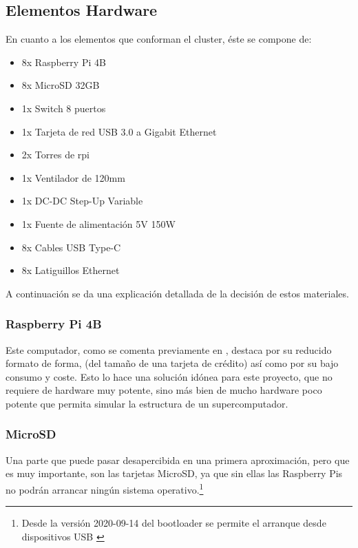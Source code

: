 \subsection{Elementos Hardware}


En cuanto a los elementos que conforman el cluster, éste se compone de:
\begin{itemize}
    \item 8x Raspberry Pi 4B
    \item 8x MicroSD 32GB
    \item 1x Switch 8 puertos
    \item 1x Tarjeta de red USB 3.0 a Gigabit Ethernet 
    \item 2x Torres de \acrshort{rpi}
    \item 1x Ventilador de 120mm
    \item 1x DC-DC Step-Up Variable 
    \item 1x Fuente de alimentación 5V 150W
    \item 8x Cables USB Type-C
    \item 8x Latiguillos Ethernet
\end{itemize}

A continuación se da una explicación detallada de la decisión de estos materiales.

\subsubsection{Raspberry Pi 4B}
Este computador, como se comenta previamente en , destaca por su reducido formato de forma, (del tamaño de una tarjeta de crédito) así como por su bajo consumo y coste. Esto lo hace una solución idónea para este proyecto, que no requiere de hardware muy potente, sino más bien de mucho hardware poco potente que permita simular la estructura de un supercomputador.


\subsubsection{MicroSD}
Una parte que puede pasar desapercibida en una primera aproximación, pero que es muy importante, son las tarjetas MicroSD, ya que sin ellas las Raspberry Pis no podrán arrancar ningún sistema operativo.\footnote{Desde la versión 2020-09-14 del bootloader se permite el arranque desde dispositivos USB \cite{rpibootloader20200903}}

